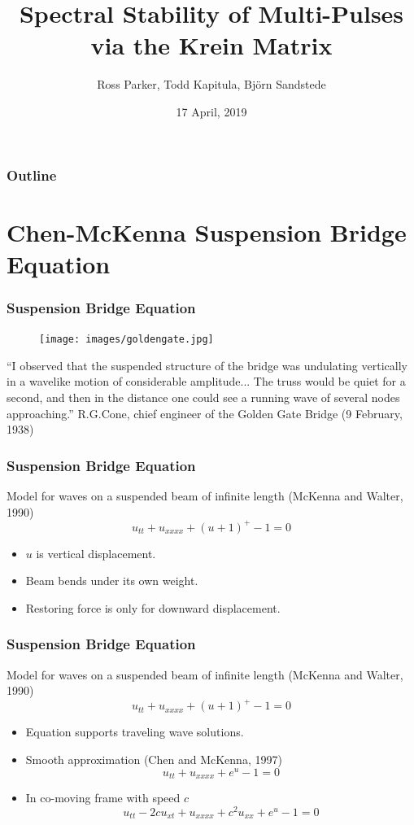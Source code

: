 \documentclass[16pt]{beamer}
\title[Multi-Pulse Stability]{Spectral Stability of Multi-Pulses via the Krein Matrix}
\author[R. Parker]{Ross Parker, Todd Kapitula, Bj{\"o}rn Sandstede}
\institute{Division of Applied Mathematics, Brown University\\
Department of Mathematics and Statistics, Calvin College}
\date{17 April, 2019}
\begin{document}
 
\frame{\titlepage}
 
\begin{frame}
\frametitle{Outline}
\tableofcontents
\end{frame}

\section{Chen-McKenna Suspension Bridge Equation}

\begin{frame}
	\frametitle{Suspension Bridge Equation}
		\begin{figure}
	    \begin{center}
	    \texttt{[image: images/goldengate.jpg]}
	    \end{center}
	    \end{figure}
		``I observed that the suspended structure of the bridge was undulating vertically in a wavelike motion of considerable amplitude... The truss would be quiet for a second, and then in the distance one could see a running wave of several nodes approaching.'' \textendash \: R.G.Cone, chief engineer of the
	    Golden Gate Bridge (9 February, 1938)
\end{frame}

\begin{frame}
	\frametitle{Suspension Bridge Equation}
		Model for waves on a suspended beam of infinite length (McKenna and Walter, 1990)
     	\[ u_{tt} + u_{xxxx} + (u+1)^+ - 1 = 0 \]
     \begin{itemize}
     	\item $u$ is vertical displacement.
     	\item Beam bends under its own weight.
     	\item Restoring force is only for downward displacement.
     \end{itemize}
 
\end{frame}

\begin{frame}
	\frametitle{Suspension Bridge Equation}   
		Model for waves on a suspended beam of infinite length (McKenna and Walter, 1990)
     	\[ u_{tt} + u_{xxxx} + (u+1)^+ - 1 = 0 \]
	\begin{itemize}
        \item Equation supports traveling wave solutions.
        \item Smooth approximation (Chen and McKenna, 1997)
            \[ u_{tt} + u_{xxxx} + e^{u} - 1 = 0 \]
        \item In co-moving frame with speed $c$
            \[ u_{tt} - 2 c u_{x t} + u_{xxxx} + c^2 u_{xx} + e^{u} - 1 = 0 \]
	\end{itemize}
\end{frame}
\end{document}
